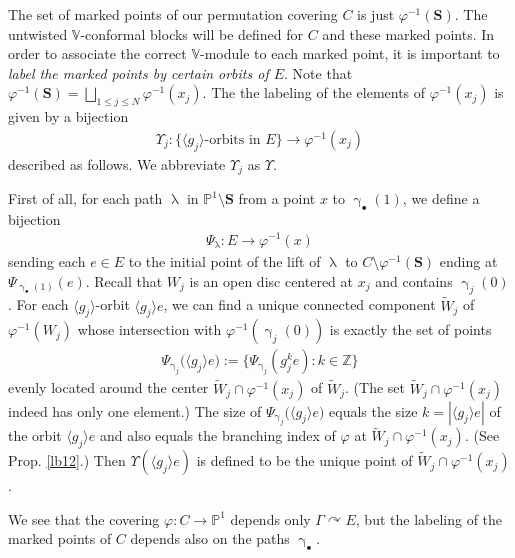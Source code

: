 \documentclass[11pt,b5paper,notitlepage]{article}
\theoremstyle{definition}
\theoremstyle{plain}
\newcommand{\wtd}{\widetilde}
\newcommand{\bk}[1]{\langle {#1}\rangle}
\newcommand{\blt}{\bullet}
\newcommand{\Vbb}{\mathbb V}
\newcommand{\Zbb}{\mathbb Z}
\newcommand{\Pbb}{\mathbb P}
\newcommand{\Sbf}{\mathbf{S}}
\numberwithin{equation}{subsection}
\begin{document}
The set of marked points of our permutation covering $C$ is just $\varphi^{-1}(\Sbf)$. The untwisted $\Vbb$-conformal blocks will be defined for $C$ and these marked points. In order to  associate the correct $\Vbb$-module to each marked point, it is important to \textit{label the marked points by certain orbits of $E$}. Note that $\varphi^{-1}(\Sbf)=\bigsqcup_{1\leq j\leq N}\varphi^{-1}(x_j)$. The the labeling of the elements of $\varphi^{-1}(x_j)$ is given by a bijection
\begin{align*}
\Upsilon_j:\{\bk{g_j}\text{-orbits in }E\}\longrightarrow \varphi^{-1}(x_j)
\end{align*}
described as follows. We abbreviate $\Upsilon_j$ as $\Upsilon$. 

First of all, for each path $\uplambda$ in $\Pbb^1\setminus\Sbf$ from a point $x$ to $\upgamma_\blt(1)$, we define a bijection
\begin{align*}
\Psi_\uplambda:E\rightarrow\varphi^{-1}(x)	
\end{align*}
sending each $e\in E$ to the initial point of the lift of $\uplambda$ to $C\setminus\varphi^{-1}(\Sbf)$ ending at $\Psi_{\upgamma_\blt(1)}(e)$. Recall that $W_j$ is an open disc centered at $x_j$ and contains $\upgamma_j(0)$. For each $\bk{g_j}$-orbit $\bk{g_j}e$, we can find a unique connected component $\wtd W_j$ of $\varphi^{-1}(W_j)$ whose intersection with $\varphi^{-1}(\upgamma_j(0))$ is exactly the set of points
\begin{align*}
\Psi_{\upgamma_j}\big(\bk{g_j}e\big):=\Big\{\Psi_{\upgamma_j}(g_j^ke):k\in\Zbb\Big\}	
\end{align*}
evenly located around the center $\wtd W_j\cap\varphi^{-1}(x_j)$  of $\wtd W_j$. (The set $\wtd W_j\cap\varphi^{-1}(x_j)$ indeed has only one element.) The size of $\Psi_{\upgamma_j}\big(\bk{g_j}e\big)$ equals the size $k=|\bk{g_j}e|$ of the orbit $\bk{g_j}e$ and also equals the branching index of $\varphi$ at $\wtd W_j\cap\varphi^{-1}(x_j)$. (See Prop. \ref{lb12}.) Then $\Upsilon(\bk{g_j}e)$  is defined to be the unique point of $\wtd W_j\cap\varphi^{-1}(x_j)$.

We see that the covering $\varphi:C\rightarrow\Pbb^1$ depends only $\Gamma\curvearrowright E$, but the labeling of the marked points of $C$ depends also on the paths $\upgamma_\blt$.
\end{document}
